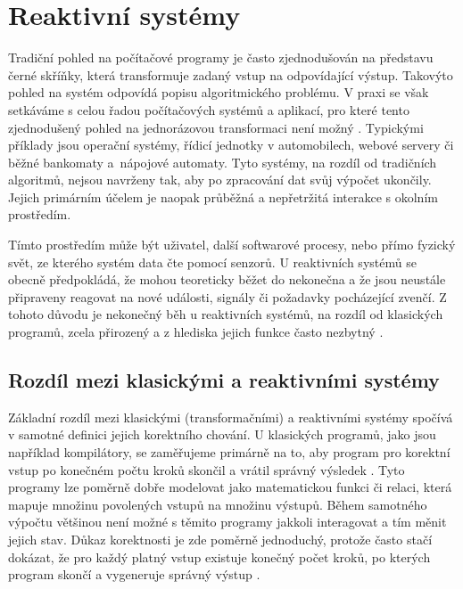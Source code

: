 \chapter{Reaktivní systémy}
\label{sec:reaktivni_systemy}
Tradiční pohled na počítačové programy je často zjednodušován na představu černé skříňky, která transformuje zadaný vstup na odpovídající výstup.
Takovýto pohled na systém odpovídá popisu algoritmického problému. 
V praxi se však setkáváme s celou řadou počítačových systémů a aplikací, pro které tento zjednodušený pohled na jednorázovou transformaci není možný \cite{aceto2007reactive}.
Typickými příklady jsou operační systémy, řídicí jednotky v automobilech, webové servery či běžné bankomaty a~nápojové automaty. 
Tyto systémy, na rozdíl od tradičních algoritmů, nejsou navrženy tak, aby po zpracování dat svůj výpočet ukončily.
Jejich primárním účelem je naopak průběžná a nepřetržitá interakce s okolním prostředím.

Tímto prostředím může být uživatel, další softwarové procesy, nebo přímo fyzický svět, ze kterého systém data čte pomocí senzorů.
U reaktivních systémů se obecně předpokládá, že mohou teoreticky běžet do nekonečna a že jsou neustále připraveny reagovat na nové události, signály či požadavky pocházející zvenčí.
Z tohoto důvodu je nekonečný běh u reaktivních systémů, na rozdíl od klasických programů, zcela přirozený a z hlediska jejich funkce často nezbytný \cite{baier2008principles}.

\section{Rozdíl mezi klasickými a reaktivními systémy}
Základní rozdíl mezi klasickými (transformačními) a reaktivními systémy spočívá v samotné definici jejich korektního chování.
U klasických programů, jako jsou například kompilátory, se zaměřujeme primárně na to, 
aby program pro korektní vstup po konečném počtu kroků skončil a vrátil správný výsledek \cite{presentation1}.
Tyto programy lze poměrně dobře modelovat jako matematickou funkci či relaci, která mapuje množinu povolených vstupů na množinu výstupů.
Během samotného výpočtu většinou není možné s těmito programy jakkoli interagovat a tím měnit jejich stav.
Důkaz korektnosti je zde poměrně jednoduchý, protože často stačí dokázat, že pro každý platný vstup existuje konečný počet kroků, po kterých program skončí a vygeneruje správný výstup \cite{aceto2007reactive}.

